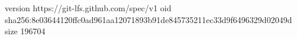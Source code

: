 version https://git-lfs.github.com/spec/v1
oid sha256:8e03644120ffc0ad961aa12071893b91de845735211ec33d9f6496329d02049d
size 196704
